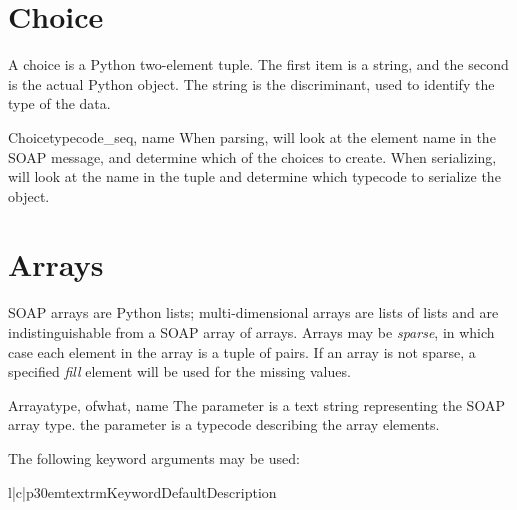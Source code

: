 \section{Choice}

A choice is a Python two-element  tuple.
The first item is a string, and the second is the actual Python object.
The string is the discriminant, used to identify the type of the data.

\begin{classdesc}{Choice}{typecode_seq, name}
When parsing, \ZSI{} will look at the element name in the SOAP message,
and determine which of the choices to create.
When serializing, \ZSI{} will look at the name in the tuple and determine
which typecode to serialize the object.
\end{classdesc}

\section{Arrays}

SOAP arrays are Python lists; multi-dimensional arrays are
lists of lists and are indistinguishable from a SOAP array of arrays.
Arrays may be \emph{sparse}, in which case each element in the
array is a tuple of  pairs.
If an array is not sparse, a specified \emph{fill} element will be
used for the missing values.


\begin{classdesc}{Array}{atype, ofwhat, name}
The  parameter is a text string representing the SOAP array type.
the  parameter is a typecode describing the array elements.
\end{classdesc}

The following keyword arguments may be used:

\begin{tableiii}{l|c|p{30em}}{textrm}{Keyword}{Default}{Description}
\end{tableiii}

